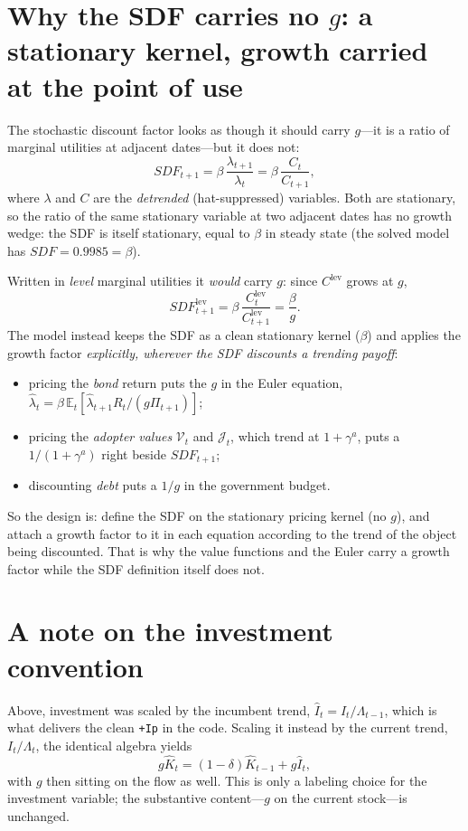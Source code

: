 \documentclass[11pt]{article}
\begin{document}
\section{Why the SDF carries no $g$: a stationary kernel, growth carried at the point of use}

The stochastic discount factor looks as though it should carry $g$---it is a ratio of
marginal utilities at adjacent dates---but it does not:
\begin{equation}
    \mathit{SDF}_{t+1} = \beta\,\frac{\lambda_{t+1}}{\lambda_t}
                       = \beta\,\frac{C_t}{C_{t+1}},
\end{equation}
where $\lambda$ and $C$ are the \emph{detrended} (hat-suppressed) variables. Both are
stationary, so the ratio of the same stationary variable at two adjacent dates has no
growth wedge: the SDF is itself stationary, equal to $\beta$ in steady state (the solved
model has $\mathit{SDF} = 0.9985 = \beta$).

Written in \emph{level} marginal utilities it \emph{would} carry $g$: since
$C^{\mathrm{lev}}$ grows at $g$,
\begin{equation}
    \mathit{SDF}^{\mathrm{lev}}_{t+1}
    = \beta\,\frac{C^{\mathrm{lev}}_t}{C^{\mathrm{lev}}_{t+1}}
    = \frac{\beta}{g}.
\end{equation}
The model instead keeps the SDF as a clean stationary kernel ($\beta$) and applies the
growth factor \emph{explicitly, wherever the SDF discounts a trending payoff}:
\begin{itemize}
    \item pricing the \emph{bond} return puts the $g$ in the Euler equation,
          $\hat\lambda_t = \beta\,\mathbb{E}_t[\hat\lambda_{t+1}R_t/(g\Pi_{t+1})]$;
    \item pricing the \emph{adopter values} $\mathcal V_t$ and $\mathcal J_t$, which trend
          at $1+\gamma^{a}$, puts a $1/(1+\gamma^{a})$ right beside $\mathit{SDF}_{t+1}$;
    \item discounting \emph{debt} puts a $1/g$ in the government budget.
\end{itemize}
So the design is: define the SDF on the stationary pricing kernel (no $g$), and attach a
growth factor to it in each equation according to the trend of the object being
discounted. That is why the value functions and the Euler carry a growth factor while the
SDF definition itself does not.

\section{A note on the investment convention}

Above, investment was scaled by the incumbent trend, $\hat I_t = I_t/\Lambda_{t-1}$,
which is what delivers the clean \texttt{+Ip} in the code. Scaling it instead by the
current trend, $I_t/\Lambda_t$, the identical algebra yields
\begin{equation}
    g\hat K_t = (1-\delta)\hat K_{t-1} + g\hat I_t,
\end{equation}
with $g$ then sitting on the flow as well. This is only a labeling choice for the
investment variable; the substantive content---$g$ on the current stock---is
unchanged.
\end{document}
